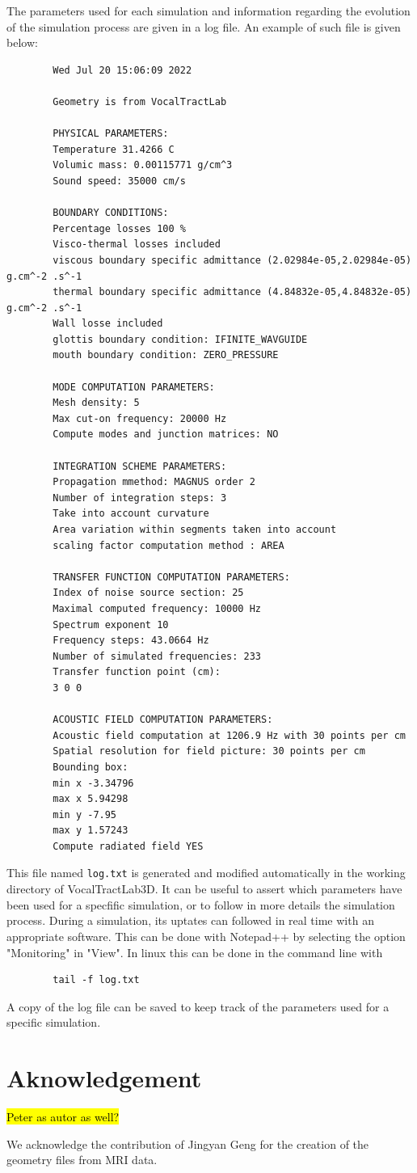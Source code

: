 \documentclass[]{article}
\begin{document}
	The parameters used for each simulation and information regarding the evolution of the 
	simulation process are given in a log file. An example of such file is given below:
	\lstset{language=}
	\begin{lstlisting}
		Wed Jul 20 15:06:09 2022
		
		Geometry is from VocalTractLab
		
		PHYSICAL PARAMETERS:
		Temperature 31.4266 C
		Volumic mass: 0.00115771 g/cm^3
		Sound speed: 35000 cm/s
		
		BOUNDARY CONDITIONS:
		Percentage losses 100 %
		Visco-thermal losses included
		viscous boundary specific admittance (2.02984e-05,2.02984e-05) g.cm^-2 .s^-1
		thermal boundary specific admittance (4.84832e-05,4.84832e-05) g.cm^-2 .s^-1
		Wall losse included
		glottis boundary condition: IFINITE_WAVGUIDE
		mouth boundary condition: ZERO_PRESSURE
		
		MODE COMPUTATION PARAMETERS:
		Mesh density: 5
		Max cut-on frequency: 20000 Hz
		Compute modes and junction matrices: NO
		
		INTEGRATION SCHEME PARAMETERS:
		Propagation mmethod: MAGNUS order 2
		Number of integration steps: 3
		Take into account curvature
		Area variation within segments taken into account
		scaling factor computation method : AREA
		
		TRANSFER FUNCTION COMPUTATION PARAMETERS:
		Index of noise source section: 25
		Maximal computed frequency: 10000 Hz
		Spectrum exponent 10
		Frequency steps: 43.0664 Hz
		Number of simulated frequencies: 233
		Transfer function point (cm): 
		3 0 0
		
		ACOUSTIC FIELD COMPUTATION PARAMETERS:
		Acoustic field computation at 1206.9 Hz with 30 points per cm
		Spatial resolution for field picture: 30 points per cm
		Bounding box:
		min x -3.34796
		max x 5.94298
		min y -7.95
		max y 1.57243
		Compute radiated field YES
	\end{lstlisting}
	
	This file named \texttt{log.txt} is generated and modified automatically in the working 
	directory of VocalTractLab3D.
	It can be useful to assert which parameters have been used for a specfific simulation,
	or to follow in more details the simulation process.
	During a simulation, its uptates can followed in real time with an appropriate software.
	This can be done with Notepad++ by selecting the option "Monitoring" in "View".
	In linux this can be done in the command line with 
	\lstset{language=bash}
	\begin{lstlisting}
		tail -f log.txt
	\end{lstlisting}
	A copy of the log file can be saved
	to keep track of the parameters used for a specific simulation.
	
	\section{Aknowledgement}
	
	\hl{Peter as autor as well?}
	
	We acknowledge the contribution of Jingyan Geng for the creation of the geometry files 
	from MRI data.
	
	\printbibliography
\end{document}
